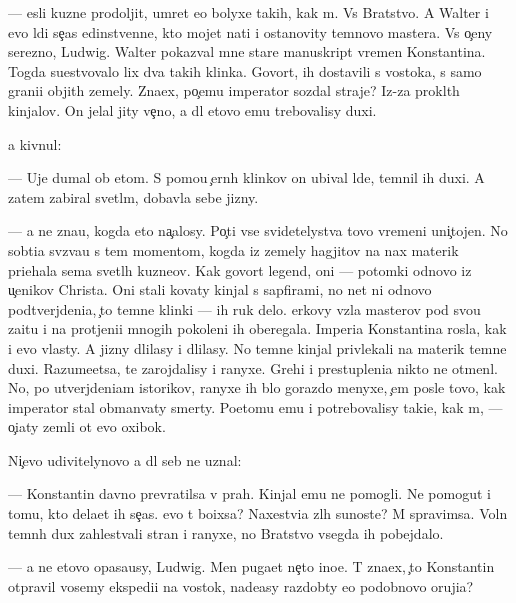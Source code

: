 \documentclass[10pt]{book}
\begin{document}
— {\Y}esli kuzne{\q} prodoljit, umret {\y}e{\x}o bolyxe takih, kak m{\yi}. Vs{\e} Bratstvo. A Walter i {\y}evo l{\iu}di se{\y}{\c}as {\y}edinstvenn{\yi}{\y}e, kto mojet na{\y}ti i ostanovity temnovo mastera. Vs{\e} o{\c}eny ser{\y}ezno, Ludwig. Walter pokaz{\yi}val mne star{\yi}{\y}e manuskript{\yi} vremen Konstantina. Togda su{\x}estvovalo lix dva takih klinka. Govor{\ia}t, ih dostavili s vostoka, s samo{\y} grani{\q}i objit{\yi}h zemely. Zna{\y}ex, po{\c}emu imperator sozdal straje{\y}? Iz-za prokl{\ia}t{\yi}h kinjalov. On jelal jity ve{\c}no, a dl{\ia} etovo {\y}emu trebovalisy duxi.

{\Y}a kivnul:

— Uje dumal ob etom. S pomo{\x}{\y}u {\c}ern{\yi}h klinkov on ubival l{\iu}de{\y}, temnil ih duxi. A zatem zabiral svetl{\yi}m, dobavl{\ia}{\y}a sebe jizny.

— {\Y}a ne zna{\y}u, kogda eto na{\c}alosy. Po{\c}ti vse svidetelystva tovo vremeni uni{\c}tojen{\yi}. No sob{\yi}ti{\y}a sv{\ia}z{\yi}va{\y}u s tem momentom, kogda iz zemely hagjitov na nax materik pri{\y}ehala sem{\y}a svetl{\yi}h kuzne{\q}ov. Kak govor{\ia}t legend{\yi}, oni — potomki odnovo iz u{\c}enikov Christa. Oni stali kovaty kinjal{\yi} s sapfirami, no net ni odnovo podtverjdeni{\y}a, {\c}to temn{\yi}{\y}e klinki — ih ruk delo. {\Q}erkovy vz{\ia}la masterov pod svo{\y}u za{\x}itu i na prot{\ia}jeni{\y}i mnogih pokoleni{\y} ih oberegala. Imperi{\y}a Konstantina rosla, kak i {\y}evo vlasty. A jizny dlilasy i dlilasy. No temn{\yi}{\y}e kinjal{\yi} privlekali na materik temn{\yi}{\y}e duxi. Razume{\y}etsa, te zarojdalisy i ranyxe. Grehi i prestupleni{\y}a nikto ne otmen{\ia}l. No, po utverjdeni{\y}am istorikov, ranyxe ih b{\yi}lo gorazdo menyxe, {\c}em posle tovo, kak imperator stal obman{\yi}vaty smerty. Poetomu {\y}emu i potrebovalisy taki{\y}e, kak m{\yi}, — o{\c}i{\x}aty zemli ot {\y}evo oxibok.

Ni{\c}evo udivitelynovo {\y}a dl{\ia} seb{\ia} ne uznal:

— Konstantin davno prevratilsa v prah. Kinjal{\yi} {\y}emu ne pomogli. Ne pomogut i tomu, kto dela{\y}et ih se{\y}{\c}as. {\C}evo t{\yi} bo{\y}ixsa? Naxestvi{\y}a zl{\yi}h su{\x}noste{\y}? M{\yi} spravimsa. Voln{\yi} temn{\yi}h dux zahlest{\yi}vali stran{\yi} i ranyxe, no Bratstvo vsegda ih pobejdalo.

— {\Y}a ne etovo opasa{\y}usy, Ludwig. Men{\ia} puga{\y}et ne{\c}to ino{\y}e. T{\yi} zna{\y}ex, {\c}to Konstantin otpravil vosemy ekspedi{\q}i{\y} na vostok, nade{\y}asy razdob{\yi}ty {\y}e{\x}o podobnovo oruji{\y}a?
\end{document}
